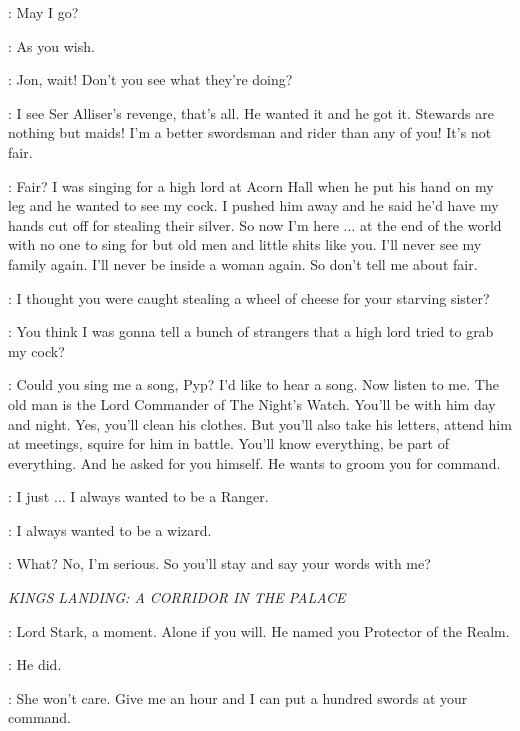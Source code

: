 \JON: May I go? 

\AEMON: As you wish. 


\SAM: Jon, wait! Don't you see what they're doing? 

\JON: I see Ser Alliser's revenge, that's all. He wanted it and he got it. Stewards are nothing but maids! I'm a better swordsman and rider than any of you! It's not fair. 

\PYP: Fair? I was singing for a high lord at Acorn Hall when he put his hand on my leg and he wanted to see my cock. I pushed him away and he said he'd have my hands cut off for stealing their silver. So now I'm here $\ldots$ at the end of the world with no one to sing for but old men and little shits like you. I'll never see my family again. I'll never be inside a woman again. So don't tell me about fair. 

\SAM: I thought you were caught stealing a wheel of cheese for your starving sister? 

\PYP: You think I was gonna tell a bunch of strangers that a high lord tried to grab my cock? 

\SAM: Could you sing me a song, Pyp? I'd like to hear a song.  Now listen to me. The old man is the Lord Commander of The Night's Watch. You'll be with him day and night. Yes, you'll clean his clothes. But you'll also take his letters, attend him at meetings, squire for him in battle. You'll know everything, be part of everything. And he asked for you himself. He wants to groom you for command. 

\JON: I just $\ldots$ I always wanted to be a Ranger. 

\SAM: I always wanted to be a wizard. 


\SAM: What? No, I'm serious. So you'll stay and say your words with me? 


\scene

\textit{KINGS LANDING: A CORRIDOR IN THE PALACE} 


\RENLY: Lord Stark, a moment. Alone if you will.  He named you Protector of the Realm. 

\NED: He did. 

\RENLY: She won't care. Give me an hour and I can put a hundred swords at your command. 

